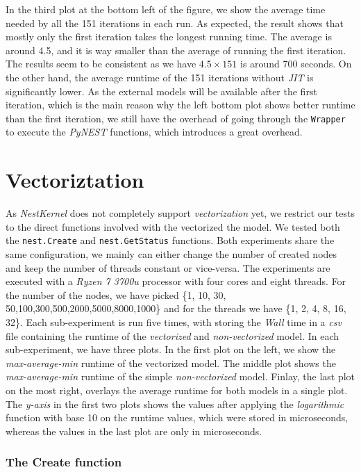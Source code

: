 In the third plot at the bottom left of the figure, we show the average time needed by all the 151 iterations in each run. As expected, the result shows that mostly only the first iteration takes the longest running time. The average is around 4.5, and it is way smaller than the average of running the first iteration. The results seem to be consistent as we have $4.5 \times 151$ is around 700 seconds. On the other hand, the average runtime of the 151 iterations without \emph{JIT} is significantly lower. As the external models will be available after the first iteration, which is the main reason why the left bottom plot shows better runtime than the first iteration, we still have the overhead of going through the \texttt{Wrapper} to execute the \emph{PyNEST} functions, which introduces a great overhead.



\section{Vectoriztation}

As \emph{NestKernel} does not completely support \emph	{vectorization} yet, we restrict our tests to the direct functions involved with the vectorized the model. We tested both the \texttt{nest.Create} and \texttt{nest.GetStatus} functions. Both experiments share the same configuration, we mainly can either change the number of created nodes and keep the number of threads constant or vice-versa. The experiments are executed with a \emph{Ryzen 7 3700u} processor with four cores and eight threads.
For the number of the nodes, we have picked \{1, 10, 30, 50,100,300,500,2000,5000,8000,1000\} and for the threads we have \{1, 2, 4, 8, 16, 32\}. Each sub-experiment is run five times, with storing the \emph{Wall} time in a \emph{csv} file containing the runtime of the \emph{vectorized} and \emph{non-vectorized} model. In each sub-experiment, we have three plots. In the first plot on the left, we show the \emph{max-average-min} runtime of the vectorized model. The middle plot shows the \emph{max-average-min} runtime of the simple \emph{non-vectorized} model. Finlay, the last plot on the most right, overlays the average runtime for both models in a single plot. The \emph{y-axis} in the first two plots shows the values after applying the \emph{logarithmic} function with base 10 on the runtime values, which were stored in microseconds, whereas the values in the last plot are only in microseconds.

\subsubsection{The Create function }


